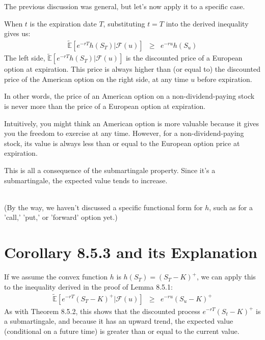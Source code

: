 \documentclass[uplatex,a4j,12pt,dvipdfmx]{jsarticle}
\begin{document}
The previous discussion was general, but let's now apply it to a specific case.

When $t$ is the expiration date $T$, substituting $t=T$ into the derived inequality gives us:
%
%
\begin{eqnarray*}
	\tilde{\mathbb{E}} \left[
		e^{-rT} h(S_{T})
		\Big| \mathcal{F}(u)
		\right]
	&\geq&
	e^{-ru}
	h(S_{u})
\end{eqnarray*}
%
%
The left side,
$
	\tilde{\mathbb{E}} \left[
		e^{-rT} h(S_{T})
		\Big| \mathcal{F}(u)
		\right]
$
is the discounted price of a European option at expiration. This price is always higher than (or equal to) the discounted price of the American option on the right side, at any time $u$ before expiration.

In other words, the price of an American option on a non-dividend-paying stock is never more than the price of a European option at expiration.

Intuitively, you might think an American option is more valuable because it gives you the freedom to exercise at any time. However, for a non-dividend-paying stock, its value is always less than or equal to the European option price at expiration.

This is all a consequence of the submartingale property. Since it's a submartingale, the expected value tends to increase.


\ \\

(By the way, we haven't discussed a specific functional form for $h$, such as for a 'call,' 'put,' or 'forward' option yet.)


\section{Corollary 8.5.3\cite{Shreve2004} and its Explanation}

If we assume the convex function $h$ is $h(S_T) = (S_T - K)^{+}$, we can apply this to the inequality derived in the proof of Lemma 8.5.1:
%
%
\begin{eqnarray*}
	\tilde{\mathbb{E}} \left[
		e^{-rT} (S_{T} - K)^{+}
		\Big| \mathcal{F}(u)
		\right]
	&\geq&
	e^{-ru}
	(S_{u} - K)^{+}
\end{eqnarray*}
%
%
As with Theorem 8.5.2, this shows that the discounted process
$e^{-rT} (S_t - K)^{+}$
is a submartingale, and because it has an upward trend, the expected value (conditional on a future time) is greater than or equal to the current value.
\end{document}
